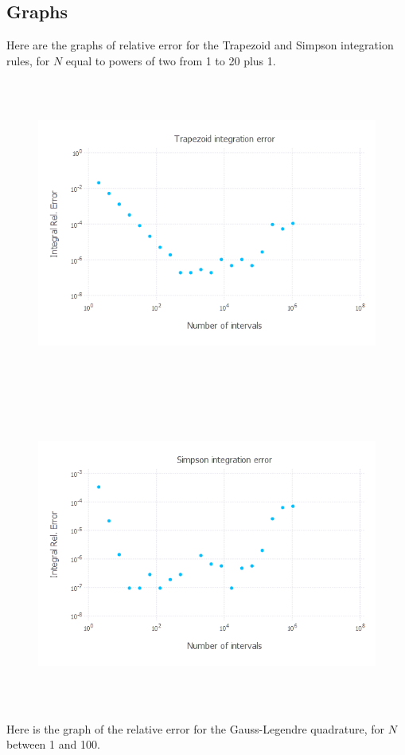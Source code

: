 \documentclass{article}
\begin{document}
\subsection{Graphs}
Here are the graphs of relative error for the Trapezoid and Simpson integration rules, for $N$ equal to powers of two from 1 to 20 plus 1.
\begin{figure}[H]
	\includegraphics[width=6in,height=4in]{"trap"}
\end{figure}
\begin{figure}[H]
	\includegraphics[width=6in,height=4in]{"simp"}
\end{figure}
Here is the graph of the relative error for the Gauss-Legendre quadrature, for $N$ between 1 and 100.
\end{document}
